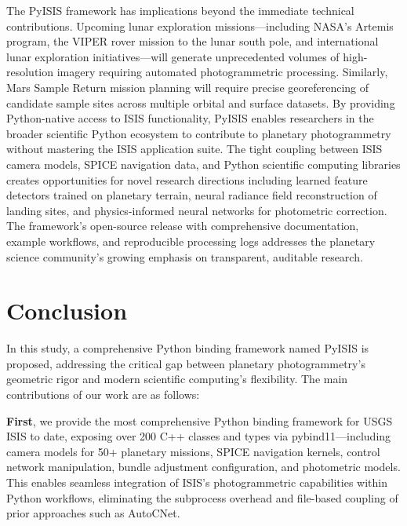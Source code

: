 \documentclass[lettersize,journal]{IEEEtran}
\newcommand{\pyisis}{PyISIS}
\begin{document}
The \pyisis{} framework has implications beyond the immediate technical contributions. Upcoming lunar exploration missions—including NASA's Artemis program, the VIPER rover mission to the lunar south pole, and international lunar exploration initiatives—will generate unprecedented volumes of high-resolution imagery requiring automated photogrammetric processing. Similarly, Mars Sample Return mission planning will require precise georeferencing of candidate sample sites across multiple orbital and surface datasets. By providing Python-native access to ISIS functionality, \pyisis{} enables researchers in the broader scientific Python ecosystem to contribute to planetary photogrammetry without mastering the ISIS application suite. The tight coupling between ISIS camera models, SPICE navigation data, and Python scientific computing libraries creates opportunities for novel research directions including learned feature detectors trained on planetary terrain, neural radiance field reconstruction of landing sites, and physics-informed neural networks for photometric correction. The framework's open-source release with comprehensive documentation, example workflows, and reproducible processing logs addresses the planetary science community's growing emphasis on transparent, auditable research.


\section{Conclusion}\label{sec:conclusion}

In this study, a comprehensive Python binding framework named \pyisis{} is proposed, addressing the critical gap between planetary photogrammetry's geometric rigor and modern scientific computing's flexibility. The main contributions of our work are as follows:

\textbf{First}, we provide the most comprehensive Python binding framework for USGS ISIS to date, exposing over 200 C++ classes and types via pybind11—including camera models for 50+ planetary missions, SPICE navigation kernels, control network manipulation, bundle adjustment configuration, and photometric models. This enables seamless integration of ISIS's photogrammetric capabilities within Python workflows, eliminating the subprocess overhead and file-based coupling of prior approaches such as AutoCNet.
\end{document}

